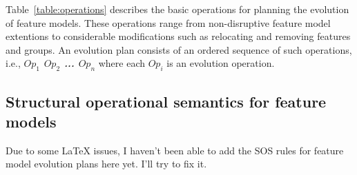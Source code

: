 \documentclass[a4paper,english]{ifimaster}
\begin{document}
Table~\vref{table:operations} describes the basic operations for planning the evolution of feature models. These operations range from non-disruptive feature model extentions to considerable modifications such as relocating and removing features and groups. An evolution plan consists of an ordered sequence of such operations, i.e., \textit{\textbf{$Op_1$ $Op_2$ ... $Op_n$}} where each $Op_i$ is an evolution operation. 

\subsection{Structural operational semantics for feature models}
\label{sub:structural-operational-semantics-for-feature-models}
Due to some \LaTeX{} issues, I haven't been able to add the SOS rules for feature model evolution plans here yet. I'll try to fix it. 

\backmatter{}

\printbibliography{}
\end{document}
